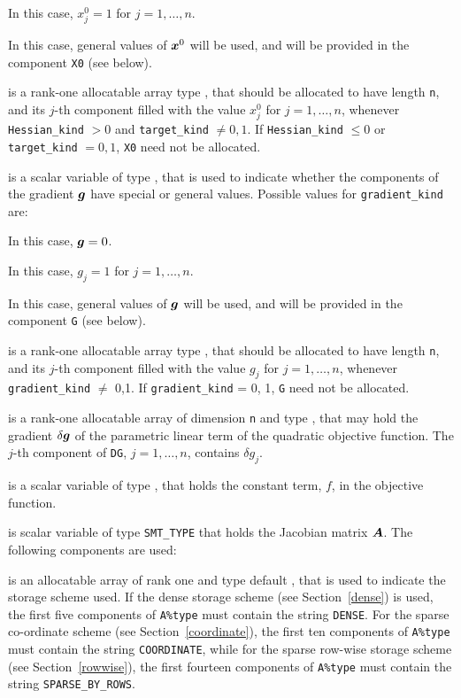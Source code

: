 \documentclass{galahad}
\begin{document}
\begin{description}
\begin{description}
 In this case, $x^0_{j} = 1$ for $j = 1, \ldots , n$.

 In this case, general values of ${\bm{x}}^0$ will be used,
     and will be provided in the component {\tt X0} (see below).
\end{description}

 is a rank-one allocatable array type \realdp, that
should be allocated to have length {\tt n}, and its $j$-th component
filled with the value $x_{j}^0$ for $j = 1, \ldots , n$,
whenever {\tt Hessian\_kind} $>0$ and {\tt target\_kind} $\neq 0,1$.
If {\tt Hessian\_kind} $\leq 0$ or {\tt target\_kind} $= 0,1$,
{\tt X0} need not be allocated.

 is a scalar variable of type \integer,
that is used to indicate whether the components of the gradient ${\bm{g}}$
have special or general values. Possible values for {\tt gradient\_kind} are:
\begin{description}
  In this case, ${\bm{g}} = 0$.

 In this case, $g_{j} = 1$ for $j = 1, \ldots , n$.

 In this case, general values of ${\bm{g}}$ will be used,
     and will be provided in the component {\tt G} (see below).
\end{description}

 is a rank-one allocatable array type \realdp, that
should be allocated to have length {\tt n}, and its $j$-th component
filled with the value $g_{j}$ for $j = 1, \ldots , n$,
whenever {\tt gradient\_kind} $\neq$ 0,1.
If {\tt gradient\_kind} {= 0, 1}, {\tt G} need not be allocated.

 is a rank-one allocatable array of dimension {\tt n} and type
\realdp, that may hold the gradient $\delta {\bm{g}}$
of the parametric linear term of the quadratic objective function.
The $j$-th component of
{\tt DG}, $j = 1,  \ldots ,  n$, contains $\delta g_{j}$.

 is a scalar variable of type
\realdp, that holds
the constant term, $f$, in the objective function.

 is scalar variable of type {\tt SMT\_TYPE}
that holds the Jacobian matrix ${\bm{A}}$. The following components are used:

\begin{description}

 is an allocatable array of rank one and type default
\character, that
is used to indicate the storage scheme used. If the dense storage scheme
(see Section~\ref{dense}) is used,
the first five components of {\tt A\%type} must contain the
string {\tt DENSE}.
For the sparse co-ordinate scheme (see Section~\ref{coordinate}),
the first ten components of {\tt A\%type} must contain the
string {\tt COORDINATE}, while
for the sparse row-wise storage scheme (see Section~\ref{rowwise}),
the first fourteen components of {\tt A\%type} must contain the
string {\tt SPARSE\_BY\_ROWS}.


\end{description}
\end{description}
\end{document}
